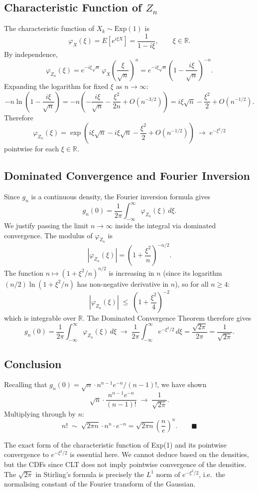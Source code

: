 \subsection{Characteristic Function of $Z_n$}

The characteristic function of $X_k \sim \mathrm{Exp}(1)$ is
$$
\varphi_X(\xi) = E[e^{i\xi X}] = \frac{1}{1 - i\xi}, \qquad \xi \in \mathbb{R}.
$$
By independence,
$$
\varphi_{Z_n}(\xi)
= e^{-i\xi\sqrt{n}}\,\varphi_X\!\left(\frac{\xi}{\sqrt{n}}\right)^n
= e^{-i\xi\sqrt{n}}\left(1 - \frac{i\xi}{\sqrt{n}}\right)^{-n}.
$$
Expanding the logarithm for fixed $\xi$ as $n \to \infty$:
$$
-n\ln\!\left(1 - \frac{i\xi}{\sqrt{n}}\right)
= -n\left(-\frac{i\xi}{\sqrt{n}} - \frac{\xi^2}{2n} + O(n^{-3/2})\right)
= i\xi\sqrt{n} - \frac{\xi^2}{2} + O(n^{-1/2}).
$$
Therefore
$$
\varphi_{Z_n}(\xi) = \exp\!\left(i\xi\sqrt{n} - i\xi\sqrt{n} - \frac{\xi^2}{2} + O(n^{-1/2})\right) \;\longrightarrow\; e^{-\xi^2/2}
$$
pointwise for each $\xi \in \mathbb{R}$.

\subsection{Dominated Convergence and Fourier Inversion}

Since $g_n$ is a continuous density, the Fourier inversion formula gives
$$
g_n(0) = \frac{1}{2\pi}\int_{-\infty}^{\infty} \varphi_{Z_n}(\xi)\,d\xi.
$$
We justify passing the limit $n \to \infty$ inside the integral via dominated convergence. The modulus of $\varphi_{Z_n}$ is
$$
|\varphi_{Z_n}(\xi)| = \left(1 + \frac{\xi^2}{n}\right)^{-n/2}.
$$
The function $n \mapsto (1 + \xi^2/n)^{n/2}$ is increasing in $n$ (since its logarithm $(n/2)\ln(1+\xi^2/n)$ has non-negative derivative in $n$), so for all $n \ge 4$:
$$
|\varphi_{Z_n}(\xi)| \;\le\; \left(1 + \frac{\xi^2}{4}\right)^{-2}
$$
which is integrable over $\mathbb{R}$. The Dominated Convergence Theorem therefore gives
$$
g_n(0) = \frac{1}{2\pi}\int_{-\infty}^{\infty} \varphi_{Z_n}(\xi)\,d\xi
\;\longrightarrow\;
\frac{1}{2\pi}\int_{-\infty}^{\infty} e^{-\xi^2/2}\,d\xi
= \frac{\sqrt{2\pi}}{2\pi} = \frac{1}{\sqrt{2\pi}}.
$$

\subsection{Conclusion}

Recalling that $g_n(0) = \sqrt{n} \cdot n^{n-1}e^{-n}/(n-1)!$, we have shown
$$
\sqrt{n}\cdot\frac{n^{n-1} e^{-n}}{(n-1)!} \;\longrightarrow\; \frac{1}{\sqrt{2\pi}}.
$$
Multiplying through by $n$:
$$
n! \;\sim\; \sqrt{2\pi n}\cdot n^n \cdot e^{-n} = \sqrt{2\pi n}\left(\frac{n}{e}\right)^n. \qquad \blacksquare
$$

\begin{remark}
 The exact form of the characteristic function of Exp(1) and its pointwise convergence to $e^{-\xi^2/2}$ is essential here. We cannot deduce based on the densities, but the CDFs since CLT does not imply pointwise convergence of the densities. The $\sqrt{2\pi}$ in Stirling's formula is precisely the $L^1$ norm of $e^{-\xi^2/2}$, i.e.\ the normalising constant of the Fourier transform of the Gaussian.
\end{remark}
